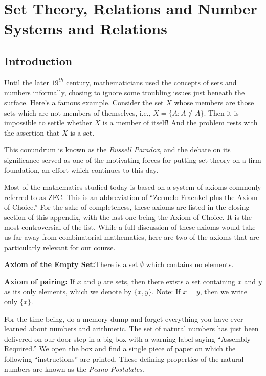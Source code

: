 
\chapter{Set Theory, Relations and Number Systems and Relations}\label{app:numsys}

\section{Introduction}

Until the later $19^{th}$ century, mathematicians used the concepts
of sets and numbers informally, chosing to ignore some troubling
issues just beneath the surface.  Here's a famous example.
Consider the set $X$ whose members are those sets which
are not members of themselves, i.e., $X=\{A: A \notin A\}$.  Then
it is impossible to settle whether $X$ is a member of itself!  
And the problem rests with the assertion that $X$ is a set.

This conundrum is known as the \textit{Russell Paradox}, and the debate 
on its significance served as one of the motivating forces for putting
set theory on a firm foundation, an effort which continues to this
day.

Most of the mathematics studied today is based on a system 
of axioms commonly referred to as ZFC.  This is an
abbreviation of ``Zermelo-Fraenkel plus the Axiom of Choice.''  
For the sake of completeness, these axioms are listed in the closing
section of this appendix, with the last one being the Axiom of Choice.
It is the most controversial of the list.  While a full discussion of these 
axioms would take us far away from combinatorial mathematics, here 
are two of the axioms that are particularly relevant for our course.

\medskip
\noindent
\textbf{Axiom of the Empty Set:}\quad There is a set $\emptyset$ which
contains no elements.

\medskip
\noindent
\textbf{Axiom of pairing:}\quad
If $x$ and $y$ are sets, then there exists a set containing $x$ and $y$
as its only elements, which we denote by $\{x,y\}$.  Note: If
$x=y$, then we write only $\{x\}$.

For the time being, do a memory dump and forget everything you have ever
learned about numbers and arithmetic. The set
of natural numbers has just been delivered on our
door step in a big box with a warning label saying ``Assembly
Required.''  We open the box and find a single piece of paper
on which the following ``instructions'' are printed.  These
defining properties of the natural numbers are known as the \textit{Peano 
Postulates}.

